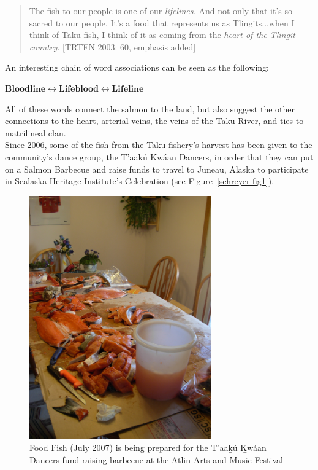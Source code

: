 \begin{quote}
The fish to our people is one of our \textit{lifelines.} And not only that it’s so sacred to our people. It’s a food that represents us as Tlingits...when I think of Taku fish, I think of it as coming from the \textit{heart of the Tlingit country}. [TRTFN 2003: 60, emphasis added]
\end{quote}
\noindent
An interesting chain of word associations can be seen as the following:

\begin{center}
$ \textbf{Bloodline} \longleftrightarrow  \textbf{Lifeblood} \longleftrightarrow \textbf{Lifeline}$
\end{center}

All of these words connect the salmon to the land, but also suggest the other connections to the heart, arterial veins, the veins of the Taku River, and ties to matrilineal clan. \\

Since 2006, some of the fish from the Taku fishery’s harvest has been given to the community’s dance group, the T'aak̲ú K̲wáan Dancers, in order that they can put on a Salmon Barbecue and raise funds to travel to Juneau, Alaska to participate in Sealaska Heritage Institute’s Celebration (see Figure~\ref{schreyer-fig1}).

\begin{figure}
    \centering
    \includegraphics[width=0.7\textwidth]{figures/schreyer-fig2}
    \caption{Food Fish (July 2007) is being prepared for the T’aak̲ú K̲wáan Dancers fund raising barbecue at the Atlin Arts and Music Festival}
    \label{schreyer-fig2}
\end{figure}


